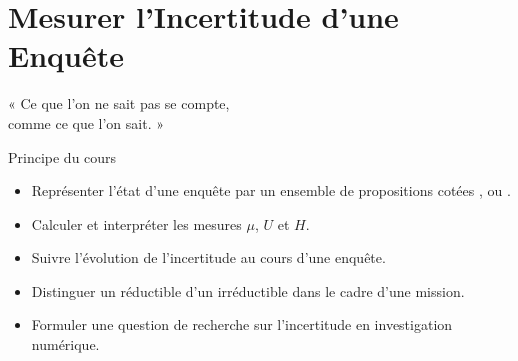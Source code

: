 
\chapter{Mesurer l'Incertitude d'une Enquête}
\label{chap:auditologie}

\epigraph{%
    « Ce que l'on ne sait pas se compte,\\
    comme ce que l'on sait. »%
}{Principe du cours}


\begin{boxobjectifs}
\begin{itemize}
    \item Représenter l'état d'une enquête par un ensemble de propositions
          cotées \OUI{}, \NON{} ou \NEK{}.
    \item Calculer et interpréter les mesures $\mu$, $U$ et $H$.
    \item Suivre l'évolution de l'incertitude au cours d'une enquête.
    \item Distinguer un \NEK{} réductible d'un \NEK{} irréductible dans le
          cadre d'une mission.
    \item Formuler une question de recherche sur l'incertitude en
          investigation numérique.
\end{itemize}
\end{boxobjectifs}

\bigskip

